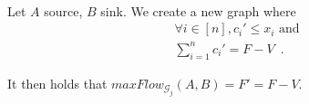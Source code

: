 \begin{theorem} \ \\
   \label{trusttransfer}
   Let $A$ source, $B$ sink. We create a new graph where
   \begin{equation*}
   \begin{gathered}
     \forall i \in [n], c_i' \leq x_i \mbox{ and}\\
     \sum\limits_{i=1}^{n}{c_i'} = F - V \enspace.
   \end{gathered}
   \end{equation*}

   It then holds that $maxFlow_{\mathcal{G}_j}\left(A, B\right) = F' = F - V$.
\end{theorem}
